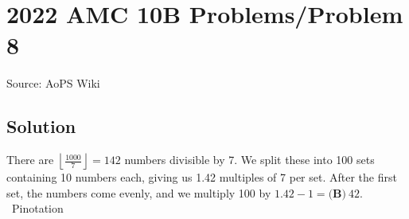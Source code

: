 \documentclass[12pt]{article}
\begin{document}
\section*{{2022 AMC 10B Problems/Problem 8}}
Source: AoPS Wiki

\subsection*{Solution}
There are $\left\lfloor \frac{1000}{7} \right\rfloor = 142$ numbers divisible by 7. We split these into 100 sets containing 10 numbers each, giving us 1.42 multiples of 7 per set. After the first set, the numbers come evenly, and we multiply 100 by $1.42 - 1 = \boxed{\textbf{(B)}\ 42}.$ ~Pinotation
\end{document}

